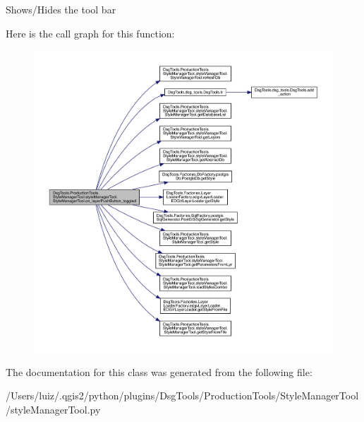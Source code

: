 \begin{DoxyVerb}Shows/Hides the tool bar
\end{DoxyVerb}
 Here is the call graph for this function\+:
\nopagebreak
\begin{figure}[H]
\begin{center}
\leavevmode
\includegraphics[width=350pt]{class_dsg_tools_1_1_production_tools_1_1_style_manager_tool_1_1style_manager_tool_1_1_style_manager_tool_a892e86078f6cb3f52a47de050b7519ee_cgraph}
\end{center}
\end{figure}


The documentation for this class was generated from the following file\+:\begin{DoxyCompactItemize}
\item 
/\+Users/luiz/.\+qgis2/python/plugins/\+Dsg\+Tools/\+Production\+Tools/\+Style\+Manager\+Tool/style\+Manager\+Tool.\+py\end{DoxyCompactItemize}
